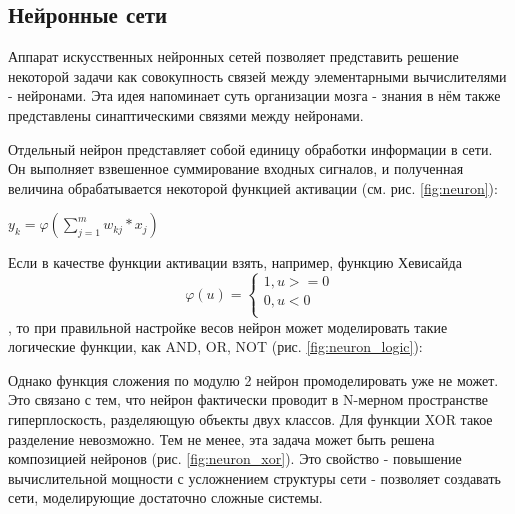 
\subsection{Нейронные сети}


Аппарат искусственных нейронных сетей позволяет представить решение некоторой задачи как совокупность связей между элементарными вычислителями - нейронами. Эта идея напоминает суть организации мозга - знания в нём также представлены синаптическими связями между нейронами. 

Отдельный нейрон представляет собой единицу обработки информации в сети. Он выполняет взвешенное суммирование входных сигналов, и полученная величина обрабатывается некоторой функцией активации (см. рис. \ref{fig:neuron}): 

$y_k=\varphi(\sum_{j=1}^m w_{kj}*x_j)$



Если в качестве функции активации взять, например, функцию Хевисайда 
\[
  \varphi(u)=\begin{cases}
               1, u>=0\\
               0, u<0 \\
              \end{cases}
\], то при правильной настройке весов нейрон может моделировать такие логические функции, как AND, OR, NOT (рис. \ref{fig:neuron_logic}):




Однако функция сложения по модулю 2 нейрон промоделировать уже не может. Это связано с тем, что нейрон фактически проводит в N-мерном пространстве гиперплоскость, разделяющую объекты двух классов. Для функции XOR такое разделение невозможно. Тем не менее, эта задача может быть решена композицией нейронов (рис. \ref{fig:neuron_xor}). Это свойство - повышение вычислительной мощности с усложнением структуры сети - позволяет создавать сети, моделирующие достаточно сложные системы. 

